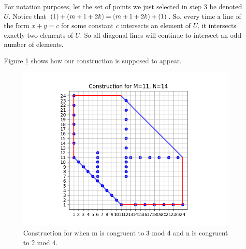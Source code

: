 \documentclass[10pt]{../usamts}
\begin{document}
\begin{solution}
\begin{enumerate}
    For notation purposes, let the set of points we just selected in step 3 be denoted $U$. Notice that $\left( 1 \right)+\left( m+1+2k \right) = \left( m+1+2k \right)+\left( 1 \right)$. So, every time a line of the form $x+y=c$ for some constant $c$ intersects an element of $U$, it intersects exactly two elements of $U$. So all diagonal lines will continue to intersect an odd number of elements.
\end{enumerate}

Figure \ref{fig:twothreeconstruct} shows how our construction is supposed to appear.
\begin{figure}[htbp]
\centering
    \includegraphics[width=12cm]{round2/p5construct/construct_11_14.png}
    \caption{Construction for when m is congruent to 3 mod 4 and n is congruent to 2 mod 4.}
    \label{fig:twothreeconstruct}
\end{figure}

\end{solution}
\end{document}
